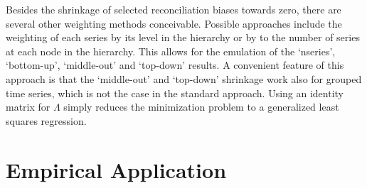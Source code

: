 \documentclass[a4paper,fleqn,11pt]{article}
\begin{document}
Besides the shrinkage of selected reconciliation biases towards zero, there are several other weighting methods conceivable. Possible approaches include the weighting of each series by its level in the hierarchy or by to the number of series at each node in the hierarchy. This allows for the emulation of the `nseries', `bottom-up', `middle-out' and `top-down' results. A convenient feature of this approach is that the `middle-out' and `top-down' shrinkage work also for grouped time series, which is not the case in the standard approach. Using an identity matrix for $\Lambda$ simply reduces the minimization problem to a generalized least squares regression.\\
\clearpage


\section{Empirical Application}
\label{sec:appl}
\end{document}
